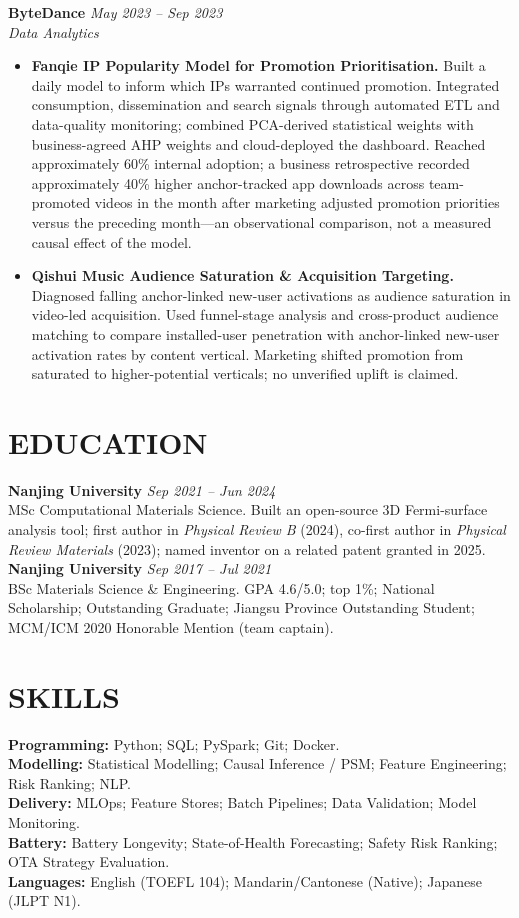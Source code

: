 \documentclass[a4paper,10pt]{article}
\begin{document}
\textbf{ByteDance} \hfill \textit{May 2023 -- Sep 2023}\\
\textit{Data Analytics}
\begin{itemize}
\item \textbf{Fanqie IP Popularity Model for Promotion Prioritisation.} Built a daily model to inform which IPs warranted continued promotion. Integrated consumption, dissemination and search signals through automated ETL and data-quality monitoring; combined PCA-derived statistical weights with business-agreed AHP weights and cloud-deployed the dashboard. Reached approximately 60\% internal adoption; a business retrospective recorded approximately 40\% higher anchor-tracked app downloads across team-promoted videos in the month after marketing adjusted promotion priorities versus the preceding month---an observational comparison, not a measured causal effect of the model.
\item \textbf{Qishui Music Audience Saturation \& Acquisition Targeting.} Diagnosed falling anchor-linked new-user activations as audience saturation in video-led acquisition. Used funnel-stage analysis and cross-product audience matching to compare installed-user penetration with anchor-linked new-user activation rates by content vertical. Marketing shifted promotion from saturated to higher-potential verticals; no unverified uplift is claimed.
\end{itemize}

\section{EDUCATION}
\textbf{Nanjing University} \hfill \textit{Sep 2021 -- Jun 2024}\\
MSc Computational Materials Science. Built an open-source 3D Fermi-surface analysis tool; first author in \textit{Physical Review B} (2024), co-first author in \textit{Physical Review Materials} (2023); named inventor on a related patent granted in 2025.\\[1pt]
\textbf{Nanjing University} \hfill \textit{Sep 2017 -- Jul 2021}\\
BSc Materials Science \& Engineering. GPA 4.6/5.0; top 1\%; National Scholarship; Outstanding Graduate; Jiangsu Province Outstanding Student; MCM/ICM 2020 Honorable Mention (team captain).

\section{SKILLS}
\textbf{Programming:} Python; SQL; PySpark; Git; Docker.\\[1pt]
\textbf{Modelling:} Statistical Modelling; Causal Inference / PSM; Feature Engineering; Risk Ranking; NLP.\\[1pt]
\textbf{Delivery:} MLOps; Feature Stores; Batch Pipelines; Data Validation; Model Monitoring.\\[1pt]
\textbf{Battery:} Battery Longevity; State-of-Health Forecasting; Safety Risk Ranking; OTA Strategy Evaluation.\\[1pt]
\textbf{Languages:} English (TOEFL 104); Mandarin/Cantonese (Native); Japanese (JLPT N1).
\end{document}
